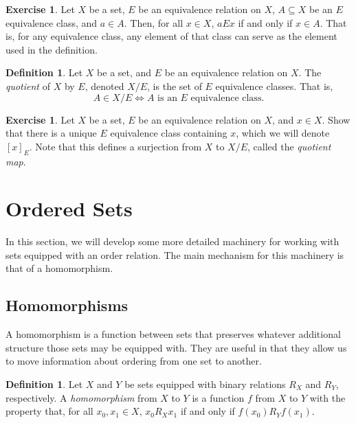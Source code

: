 \documentclass[letterpaper]{article}
\theoremstyle{definition}
\newtheorem{definition}[theorem]{Definition}
\newtheorem{exercise}[theorem]{Exercise}
\newcommand{\defterm}{\emph}
\renewcommand{\subset}{\subseteq}
\begin{document}
\begin{exercise}
  Let \(X\) be a set, \(E\) be an equivalence relation on \(X\), \(A
  \subset X\) be an \(E\) equivalence class, and \(a \in A\).  Then,
  for all \(x \in X\), \(aEx\) if and only if \(x \in A\).  That is,
  for any equivalence class, any element of that class can serve as
  the element used in the definition.
\end{exercise}

\begin{definition}
  Let \(X\) be a set, and \(E\) be an equivalence relation on \(X\).
  The \defterm{quotient} of \(X\) by \(E\), denoted \(X/E\), is the
  set of \(E\) equivalence classes.  That is,
  \[A \in X/E \iff A \text{ is an } E \text{ equivalence class.}\]
\end{definition}

\begin{exercise}
  Let \(X\) be a set, \(E\) be an equivalence relation on \(X\), and
  \(x \in X\).  Show that there is a unique \(E\) equivalence class
  containing \(x\), which we will denote \([x]_E\).  Note that this
  defines a surjection from \(X\) to \(X/E\), called the
  \defterm{quotient map}.
\end{exercise}

\section{Ordered Sets}
In this section, we will develop some more detailed machinery for
working with sets equipped with an order relation.  The main mechanism
for this machinery is that of a homomorphism.

\subsection{Homomorphisms}
A homomorphism is a function between sets that preserves whatever
additional structure those sets may be equipped with.  They are useful
in that they allow us to move information about ordering from one set
to another.

\begin{definition}
  Let \(X\) and \(Y\) be sets equipped with binary relations \(R_X\)
  and \(R_Y\), respectively.  A \defterm{homomorphism} from \(X\) to
  \(Y\) is a function \(f\) from \(X\) to \(Y\) with the property
  that, for all \(x_0,x_1 \in X\), \(x_0R_Xx_1\) if and only if
  \(f(x_0)R_Yf(x_1)\).
\end{definition}
\end{document}
